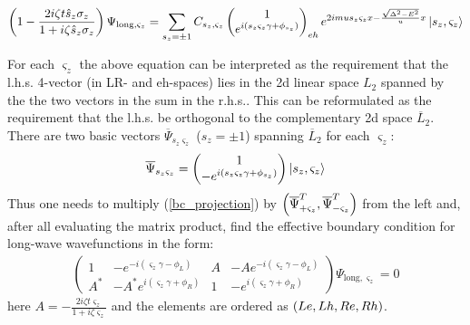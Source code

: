\begin{gather}
\label{bc_projection}
	\left(1-\frac{2i\zeta t\hat{s}_z\sigma_z}{1+i\zeta \hat{s}_z\sigma_z}\right)
	\Psi_{\mathrm{long},\varsigma_z}
	=
	\sum_{s_z=\pm1}
	C_{s_z,\varsigma_z}
			\begin{pmatrix}
	1
	\\
	e^{i\left(s_z\varsigma_z\gamma+\phi_{s_z}\right)}
	\end{pmatrix}_{eh}
	e^{2imus_z\varsigma_zx -\frac{\sqrt{\Delta^2-E^2}}{u}x}
	\ket{s_z, \varsigma_z}
\end{gather}

For each $ \varsigma_z $ the above equation can be interpreted as the requirement that the l.h.s. 4-vector (in LR- and eh-spaces) lies in the 2d linear space $ L_{2} $ spanned by the the two vectors in the sum in the r.h.s.. This can be reformulated as the requirement that the l.h.s. be orthogonal to the complementary 2d space $ \overline{L}_{2} $. There are two basic vectors $ \overline{\Psi}_{s_z\varsigma_{z}} $ ($ s_z=\pm1 $) spanning $ \overline{L}_{2} $ for each $ \varsigma_z $:
\begin{gather}
	\overline{\Psi}_{s_z\varsigma_{z}}
	=
	\begin{pmatrix}
	1 \\
	-e^{
		i\left(
			s_z\varsigma_z\gamma
			+
			\phi_{s_z}
			\right)
		}
	\end{pmatrix}
	\ket{s_z,\varsigma_z}
\end{gather}
Thus one needs to multiply (\ref{bc_projection}) by $ \left(\overline{\Psi}^T_{+\varsigma_{z}},\overline{\Psi}^T_{-\varsigma_{z}}\right) $ from the left and, after all evaluating the matrix product, find the effective boundary condition for long-wave wavefunctions in the form:
\begin{gather}
\label{bc_matrix}
\begin{pmatrix}1 & -e^{-i\left(\varsigma_{z}\gamma-\phi_L\right)} & A & -Ae^{-i\left(\varsigma_{z}\gamma-\phi_L\right)}\\
A^{*} & -A^{*}e^{i\left(\varsigma_{z}\gamma+\phi_R\right)} & 1 & -e^{i\left(\varsigma_{z}\gamma+\phi_R\right)}
\end{pmatrix}\Psi_{\mathrm{long}, \varsigma_{z}}=0
\end{gather}
here $ A=-\frac{2i\zeta t\varsigma_z}{1+i\zeta\varsigma_z} $ and the elements are ordered as $ \left(Le,Lh,Re,Rh\right) $.

